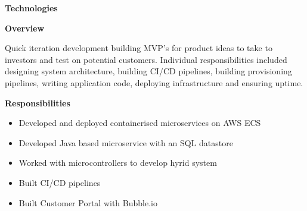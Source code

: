 \documentclass[10pt,a4paper]{altacv}
\begin{document}
\textbf{Technologies}

\divider

\textbf{Overview}

Quick iteration development building MVP's for product ideas to take to investors and test on potential customers. Individual responsibilities included designing system architecture, building CI/CD pipelines, building provisioning pipelines, writing application code, deploying infrastructure and ensuring uptime. 
\divider

\textbf{Responsibilities}
\begin{itemize}
  \item Developed and deployed containerised microservices on AWS ECS
  \item Developed Java based microservice with an SQL datastore
  \item Worked with microcontrollers to develop hyrid system
  \item Built CI/CD pipelines
  \item Built Customer Portal with Bubble.io
\end{itemize}
\end{document}
